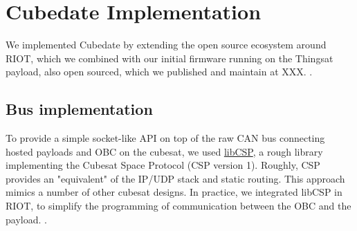 \section{Cubedate Implementation}
\label{sec:implementation}

\iffalse
SUIT is used in Cubedate payloads as a \textit{Data Delivery Mechanism} bundling
the security properties described in section IV D. The implementation described
next seeks to remain generic to be re-usable in different scenarios while tailored
for the Satellite ThingSat use case.

SUIT state machine running on the deployed device does not need to care about
how this \textit{Data} is delivered or where it will be installed, it just
needs to be handed a \textit{manifest}.

\begin{itemize}
    \item \textbf{Data Resource URI}: a locally (e.g.: mounted USB  device) or remotely
    (HTTP or CoAP endpoint) accessible file.
    \item \textbf{Data Resource Delivery Mechanism}: transport mechanism to deliver SUIT:
    e.g. \{message model, network stack, network interface\}
    bundle, or FileSystem \textit{read/write} functions.
    \textit{manifest} and data resource to the SUIT state machine.
    \item \textbf{Data Resource Installation Storage}: internal or external Volatile or
    Non-volatile storage, e.g. RAM (mission files, FemtoContainers\cite{zandberg2021femto})
    or FileSystem or internal FLASH.
\end{itemize}

As the case where the Data Resource URI points to a locally available is simply a
simplified case, a networked scenario with a URL will be described.

\francisco{PLACE HOLDER FOR A DIAGRAM}
\fi

We implemented Cubedate by extending the open source ecosystem around RIOT, which we combined with our initial firmware running on the Thingsat payload, also open sourced, which we published and maintain at XXX. .


\subsection{Bus implementation}

To provide a simple socket-like API on top of the raw CAN bus connecting hosted payloads and OBC on the cubesat, we used \href{https://github.com/libcsp/libcsp}{libCSP}, a rough library implementing the Cubesat Space Protocol (CSP version 1). Roughly, CSP provides an "equivalent" of the IP/UDP stack and static routing. This approach mimics a number of other cubesat designs. In practice, we integrated libCSP in RIOT, to simplify the programming of communication between the OBC and the payload.%
.

